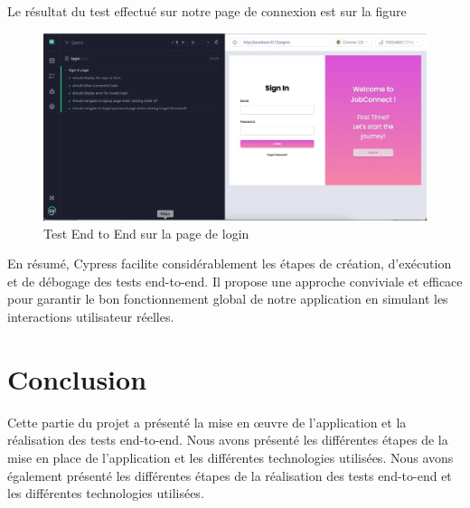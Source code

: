 Le résultat du test effectué sur notre page de connexion est sur la figure \cite{cy5}

\begin{figure}[htbp]
   \centering
   \includegraphics[scale=0.4]{cypress/5.jpg} 
   \caption{ Test End to End sur la page de login}
   \label{fig:cy5}
\end{figure}

En résumé, Cypress facilite considérablement les étapes de création, d’exécution et de débogage des tests end-to-end. Il propose une approche conviviale et eﬀicace pour garantir le bon fonctionnement global de notre application en simulant les interactions utilisateur réelles.


\section{Conclusion}
Cette partie du projet a présenté la mise en œuvre de l'application et  la  réalisation  des tests end-to-end. 
Nous avons présenté les différentes étapes de la mise en place de l'application et les différentes
technologies utilisées. Nous avons également présenté les différentes étapes de la réalisation des tests
end-to-end et les différentes technologies utilisées. 
\newline
